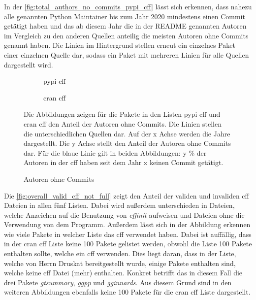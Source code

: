 In der \autoref{fig:total_authors_no_commits_pypi_cff} lässt sich erkennen, dass nahezu alle genannten Python Maintainer bis zum Jahr 2020 mindestens einen Commit getätigt haben und das ab diesem Jahr die in der README genannten Autoren im Vergleich zu den anderen Quellen anteilig die meisten Autoren ohne Commits genannt haben.
Die Linien im Hintergrund stellen erneut ein einzelnes Paket einer einzelnen Quelle dar, sodass ein Paket mit mehreren Linien für alle Quellen dargestellt wird.

\begin{figure}
    \begin{subfigure}{.5\textwidth}
        \centering
        
        \caption{\gls{pypi} \gls{cff}}
        \label{fig:total_authors_no_commits_pypi_cff}
    \end{subfigure}%
    \begin{subfigure}{.5\textwidth}
        \centering
        
        \caption{\gls{cran} \gls{cff}}
        \label{fig:total_authors_no_commits_cran_cff}
    \end{subfigure}
    \caption{Autoren ohne Commits}
    \label{fig:total_authors_no_commits}
    \small
    \raggedright
    Die Abbildungen zeigen für die Pakete in den Listen \gls{pypi} \gls{cff} und \gls{cran} \gls{cff} den Anteil der Autoren ohne Commits. Die Linien stellen die unterschiedlichen Quellen dar. Auf der x Achse werden die Jahre dargestellt. Die y Achse stellt den Anteil der Autoren ohne Commits dar. Für die blaue Linie gilt in beiden Abbildungen: y \% der Autoren in der \gls{cff} haben seit dem Jahr x keinen Commit getätigt.
\end{figure}

Die \autoref{fig:overall_valid_cff_not_full} zeigt den Anteil der validen und invaliden \gls{cff} Dateien in allen fünf Listen.
Dabei wird außerdem unterschieden in Dateien, welche Anzeichen auf die Benutzung von \emph{cffinit} aufweisen und Dateien ohne die Verwendung von dem Programm.
Außerdem lässt sich in der Abbildung erkennen wie viele Pakete in welcher Liste das \gls{cff} verwendet haben.
Dabei ist auffällig, dass in der \gls{cran} \gls{cff} Liste keine 100 Pakete gelistet werden, obwohl die Liste 100 Pakete enthalten sollte, welche ein \gls{cff} verwenden.
Dies liegt daran, dass in der Liste, welche von Herrn Druskat bereitgestellt wurde, einige Pakete enthalten sind, welche keine \gls{cff} Datei (mehr) enthalten.
Konkret betrifft das in diesem Fall die drei Pakete \emph{gtsummary}, \emph{ggpp} und \emph{gginnards}.
Aus diesem Grund sind in den weiteren Abbildungen ebenfalls keine 100 Pakete für die \gls{cran} \gls{cff} Liste dargestellt.


